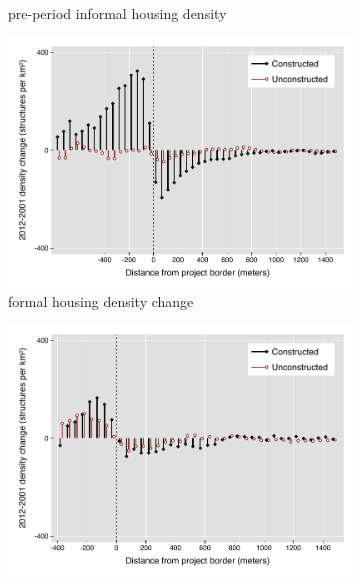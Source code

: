\documentclass[12pt]{article}
\begin{document}
\begin{figure}[h!]
\begin{subfigure}[b]{0.495\textwidth}
            \caption[]%
            {{\small pre-period informal housing density}}    
            \label{fig:preinf}
        \end{subfigure}
        \label{fig:rawbblumeans}
        \vspace{-6mm}
        \centering
        \caption[ Changes in Housing Densities in Constructed and Unconstructed Projects Areas]
        {\small 1km Square Fixed Effects (400 grid cells within) Housing Densities in Constructed and Unconstructed projects } 
        \begin{subfigure}[b]{0.495\textwidth}   
            \centering 
            \includegraphics[width=\textwidth,trim={0.3cm .3cm 0.1cm 0cm}, clip=true]{figures/bblu_for_rawchanges_4_10k.pdf}
            \caption[]%
            {{\small formal housing density change}}    
            \label{fig:forchange}
        \end{subfigure}
        \hfill
        \begin{subfigure}[b]{0.495\textwidth}   
            \centering 
            \includegraphics[width=\textwidth,trim={0.3cm .3cm 0.1cm 0cm}, clip=true]{figures/bblu_inf_rawchanges_4_10k.pdf}

\end{subfigure}
\end{figure}
\end{document}
